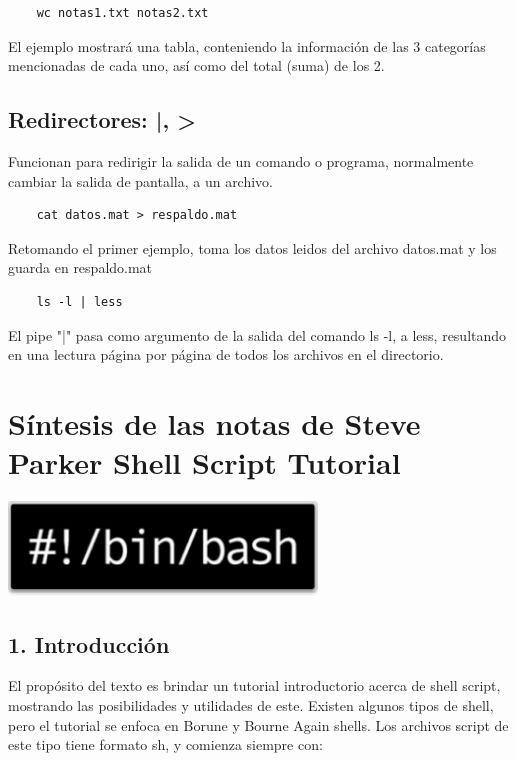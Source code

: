 \documentclass[a4paper]{article}
\begin{document}
\begin{verbatim}
	wc notas1.txt notas2.txt 
\end{verbatim}
El ejemplo mostrará una tabla, conteniendo la información de las 3 categorías mencionadas de cada uno, así como del total (suma) de los 2.

\subsection*{Redirectores: |, >}
Funcionan para redirigir la salida de un comando o programa, normalmente cambiar la salida de pantalla, a un archivo.

\begin{verbatim}
	cat datos.mat > respaldo.mat
\end{verbatim}

Retomando el primer ejemplo, toma los datos leidos del archivo datos.mat y los guarda en respaldo.mat

\begin{verbatim}
	ls -l | less
\end{verbatim}

El pipe "|" pasa como argumento de la salida del comando ls -l, a less, resultando en una lectura página por página de todos los archivos en el directorio.

\section*{Síntesis de las notas de Steve Parker Shell Script Tutorial}

\begin{center}
\includegraphics[height=2.5cm]{bash.jpg}
\end{center}

\subsection*{1. Introducción}

El propósito del texto es brindar un tutorial introductorio acerca de shell script, mostrando las posibilidades y utilidades de este. Existen algunos tipos de shell, pero el tutorial se enfoca en Borune y Bourne Again shells. Los archivos script de este tipo tiene formato sh, y comienza siempre con:
\end{document}
